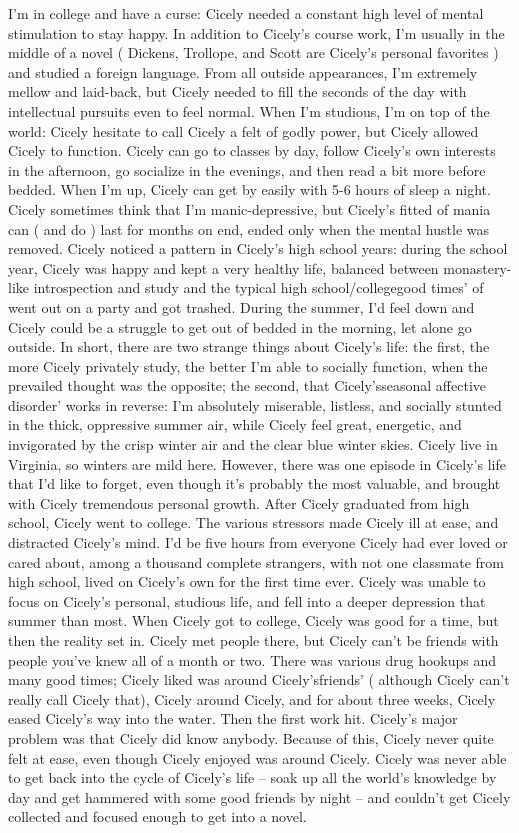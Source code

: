 \documentclass[12pt]{book}
\begin{document}
I'm in college and have a curse: Cicely needed a constant high level of mental stimulation to stay happy. In addition to Cicely's course work, I'm usually in the middle of a novel ( Dickens, Trollope, and Scott are Cicely's personal favorites ) and studied a foreign language. From all outside appearances, I'm extremely mellow and laid-back, but Cicely needed to fill the seconds of the day with intellectual pursuits even to feel normal. When I'm studious, I'm on top of the world: Cicely hesitate to call Cicely a felt of godly power, but Cicely allowed Cicely to function. Cicely can go to classes by day, follow Cicely's own interests in the afternoon, go socialize in the evenings, and then read a bit more before bedded. When I'm up, Cicely can get by easily with 5-6 hours of sleep a night. Cicely sometimes think that I'm manic-depressive, but Cicely's fitted of mania can ( and do ) last for months on end, ended only when the mental hustle was removed. Cicely noticed a pattern in Cicely's high school years: during the school year, Cicely was happy and kept a very healthy life, balanced between monastery-like introspection and study and the typical high school/collegegood times' of went out on a party and got trashed. During the summer, I'd feel down and Cicely could be a struggle to get out of bedded in the morning, let alone go outside. In short, there are two strange things about Cicely's life: the first, the more Cicely privately study, the better I'm able to socially function, when the prevailed thought was the opposite; the second, that Cicely'sseasonal affective disorder' works in reverse: I'm absolutely miserable, listless, and socially stunted in the thick, oppressive summer air, while Cicely feel great, energetic, and invigorated by the crisp winter air and the clear blue winter skies. Cicely live in Virginia, so winters are mild here. However, there was one episode in Cicely's life that I'd like to forget, even though it's probably the most valuable, and brought with Cicely tremendous personal growth. After Cicely graduated from high school, Cicely went to college. The various stressors made Cicely ill at ease, and distracted Cicely's mind. I'd be five hours from everyone Cicely had ever loved or cared about, among a thousand complete strangers, with not one classmate from high school, lived on Cicely's own for the first time ever. Cicely was unable to focus on Cicely's personal, studious life, and fell into a deeper depression that summer than most. When Cicely got to college, Cicely was good for a time, but then the reality set in. Cicely met people there, but Cicely can't be friends with people you've knew all of a month or two. There was various drug hookups and many good times; Cicely liked was around Cicely'sfriends' ( although Cicely can't really call Cicely that), Cicely around Cicely, and for about three weeks, Cicely eased Cicely's way into the water. Then the first work hit. Cicely's major problem was that Cicely did know anybody. Because of this, Cicely never quite felt at ease, even though Cicely enjoyed was around Cicely. Cicely was never able to get back into the cycle of Cicely's life -- soak up all the world's knowledge by day and get hammered with some good friends by night -- and couldn't get Cicely collected and focused enough to get into a novel. 
\end{document}
